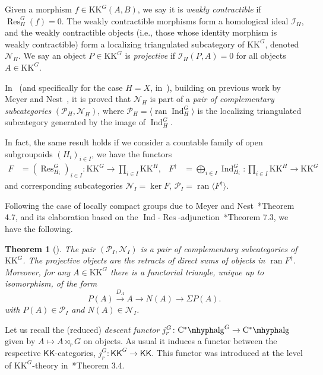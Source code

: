\documentclass[a4paper,reqno]{amsart}
\theoremstyle{plain}
\newtheorem{theorem}{Theorem}[section]
\theoremstyle{definition}
\theoremstyle{remark}
\numberwithin{equation}{section}
\newcommand{\cI}{\mathcal{I}}
\newcommand{\cN}{\mathcal{N}}
\newcommand{\cP}{\mathcal{P}}
\newcommand{\CstAlg}{\mathrm{C}^*\mhyph\mathrm{alg}}
\newcommand{\KK}{\mathrm{KK}}
\newcommand{\icKK}{\mathsf{KK}}
\DeclareMathOperator{\ran}{ran}
\DeclareMathOperator{\Ind}{Ind}
\DeclareMathOperator{\Res}{Res}
\begin{document}
Given a morphism $f\in\KK^G(A,B)$, we say it is \emph{weakly contractible} if $\Res^G_H(f)=0$. The weakly contractible morphisms form a homological ideal $\cI_H$, and the weakly contractible objects (i.e., those whose identity morphism is weakly contractible) form a localizing triangulated subcategory of $\KK^G$, denoted $\cN_H$. We say an object $P\in \KK^G$ is \emph{projective} if $\cI_H(P,A)=0$ for all objects $A\in \KK^G$.

In~\cite{val:kthpgrp} (and specifically for the case $H=X$, in~\cite{py:part-one}), building on previous work by Meyer and Nest~\cite{nestmeyer:loc}, it is proved that $\cN_H$ is part of a \emph{pair of complementary subcategories} $(\cP_H, \cN_H)$, where $\cP_H= \langle \ran\Ind_H^G \rangle $ is the localizing triangulated subcategory generated by the image of $\Ind_H^G$. 

In fact, the same result holds if we consider a countable family of open subgroupoids $(H_i)_{i\in I}$, we have the functors
\begin{align*}
 F &= (\Res^G_{H_i})_{i\in I}\colon \KK^G\to \prod_{i\in I}\KK^H,&
 F^\dagger &= \bigoplus_{i\in I} \Ind_{H_i}^G\colon \prod_{i\in I}\KK^H\to \KK^G
\end{align*}
and corresponding subcategories $\cN_I = \ker F$, $\cP_I = \ran \langle F^\dagger \rangle$.

Following the case of locally compact groups due to Meyer and Nest~\cite{nestmeyer:loc}*{Theorem 4.7}, and its elaboration based on the $\Ind$-$\Res$-adjunction~\cite{mey:two}*{Theorem 7.3}, we have the following.

\begin{theorem}[\cite{val:kthpgrp}]\label{thm:cpair}
The pair $(\cP_I,\cN_I)$ is a pair of complementary subcategories of $\KK^G$. The projective objects are the retracts of direct sums of objects in $\ran F^\dagger$. Moreover, for any $A\in \KK^G$ there is a functorial triangle, unique up to isomorphism, of the form
\begin{equation*}%
P(A)\xrightarrow{D_A} A \to N(A) \to \Sigma P(A).
\end{equation*}
with $P(A)\in \cP_I$ and $N(A)\in \cN_I$.
\end{theorem}

Let us recall the (reduced) \emph{descent functor} $j_r^G\colon \CstAlg^G\to \CstAlg$ given by $A\mapsto A\rtimes_r G$ on objects. As usual it induces a functor between the respective $\icKK$-categories, $j^G_r\colon \icKK^G\to \icKK$. This functor was introduced at the level of $\KK^G$-theory in~\cite{lg:kk}*{Theorem 3.4}.
\end{document}
